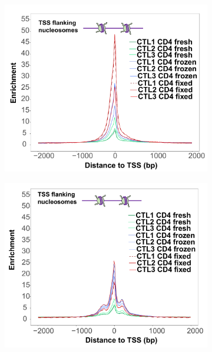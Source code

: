\begin{figure}[htbp]
~
\begin{subfigure}[b]{0.45\textwidth} 
\centering
\includegraphics[width=\textwidth]{./Results1/pdfs/Core_ATAC_CD4_fresh_frozen_fixed_internucleosome_TSS}%
\caption{}
\end{subfigure}
\begin{subfigure}[b]{0.45\textwidth} 
\centering
\includegraphics[width=\textwidth]{./Results1/pdfs/Core_ATAC_CD4_fresh_frozen_fixed_dinucleosome_TSS}%
\caption{}
\end{subfigure}

\end{figure}
